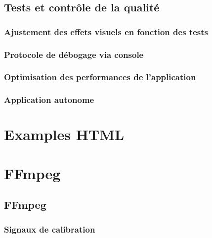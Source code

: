 \documentclass[
  french,
]{book}
\begin{document}
\hypertarget{tests-et-contruxf4le-de-la-qualituxe9}{%
\section{Tests et contrôle de la qualité}\label{tests-et-contruxf4le-de-la-qualituxe9}}

\hypertarget{ajustement-des-effets-visuels-en-fonction-des-tests}{%
\subsection{Ajustement des effets visuels en fonction des tests}\label{ajustement-des-effets-visuels-en-fonction-des-tests}}

\hypertarget{protocole-de-duxe9bogage-via-console}{%
\subsection{Protocole de débogage via console}\label{protocole-de-duxe9bogage-via-console}}

\hypertarget{optimisation-des-performances-de-lapplication}{%
\subsection{Optimisation des performances de l'application}\label{optimisation-des-performances-de-lapplication}}

\hypertarget{application-autonome}{%
\subsection{Application autonome}\label{application-autonome}}

\hypertarget{examples-html}{%
\chapter{Examples HTML}\label{examples-html}}

\hypertarget{ffmpeg}{%
\chapter{FFmpeg}\label{ffmpeg}}

\hypertarget{ffmpeg-1}{%
\section{FFmpeg}\label{ffmpeg-1}}

\hypertarget{signaux-de-calibration}{%
\subsection{Signaux de calibration}\label{signaux-de-calibration}}
\end{document}
